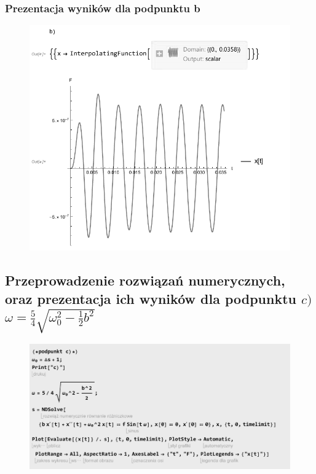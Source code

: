 \documentclass[polish,polish,a4paper]{article}
\begin{document}
		\subsubsection*{Prezentacja wyników dla podpunktu b}
		
								\begin{figure}[H]
			\centering
			\includegraphics[scale=0.9]{wyk2}
		\end{figure}
		
		\subsection{Przeprowadzenie rozwiązań numerycznych, oraz prezentacja ich wyników dla podpunktu $ c) $ $\omega = \frac{5}{4}\sqrt{\omega_{0}^2 - \frac{1}{2}b^2}$}
		
		
						\begin{figure}[H]
			\centering
			\includegraphics[scale=1]{1c}
		\end{figure}
		
\end{document}
